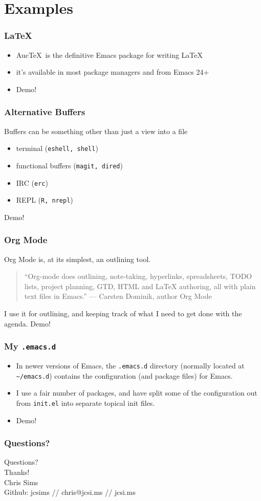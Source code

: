 \documentclass{beamer}
\begin{document}
\section{Examples}
\begin{frame}
  \frametitle{\LaTeX}
  \begin{itemize}
  \item Auc\TeX\ is the definitive Emacs package for writing \LaTeX
  \item it's available in most package managers and from Emacs 24+
  \item Demo!
  \end{itemize}
\end{frame}

\begin{frame}
  \frametitle{Alternative Buffers}
  Buffers can be something other than just a view into a file
  \begin{itemize}
  \item terminal ({\tt eshell, shell})
  \item functional buffers ({\tt magit, dired})
  \item IRC ({\tt erc})
  \item REPL ({\tt R, nrepl})
  \end{itemize}
  Demo!
\end{frame}
\begin{frame}
  \frametitle{Org Mode}
  Org Mode is, at its simplest, an outlining tool.

  \begin{quote}
    ``Org-mode does outlining, note-taking, hyperlinks, spreadsheets,
    TODO lists, project planning, GTD, HTML and LaTeX authoring, all
    with plain text files in Emacs.'' --- Carsten Dominik, author Org
    Mode
  \end{quote}
  I use it for outlining, and keeping track of what I need to get done
  with the agenda.
  \vfill
  Demo!
\end{frame}
\begin{frame}
  \frametitle{My {\tt .emacs.d}}
  \begin{itemize}
  \item In newer versions of Emacs, the {\tt .emacs.d} directory (normally
  located at {\tt \textasciitilde/emacs.d}) contains the configuration (and package
  files) for Emacs.
  \item I use a fair number of packages, and have split some of the
  configuration out from {\tt init.el} into separate topical init
  files.
  \item Demo!
  \end{itemize}

\end{frame}

\begin{frame}
  \frametitle{Questions?}
  \begin{center}
  {\large Questions?} \\
  \vfill
  {\large Thanks!} \\
  Chris Sims \\
  Github: jcsims // chris@jcsi.ms // jcsi.ms
  \end{center}
\end{frame}
\end{document}
